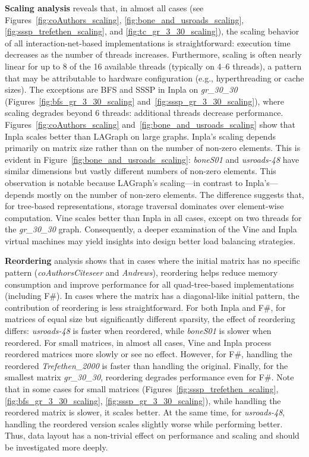 \textbf{Scaling analysis} reveals that, in almost all cases (see Figures~\ref{fig:coAuthors_scaling}, \ref{fig:bone_and_usroads_scaling}, \ref{fig:sssp_trefethen_scaling}, and \ref{fig:tc_gr_3_30_scaling}), the scaling behavior of all interaction-net-based implementations is straightforward: execution time decreases as the number of threads increases.
Furthermore, scaling is often nearly linear for up to 8 of the 16 available threads (typically on 4--6 threads), a pattern that may be attributable to hardware configuration (e.g., hyperthreading or cache sizes).
The exceptions are BFS and SSSP in Inpla on \emph{gr\_30\_30} (Figures~\ref{fig:bfs_gr_3_30_scaling} and~\ref{fig:sssp_gr_3_30_scaling}), where scaling degrades beyond 6 threads: additional threads decrease performance. 
Figures~\ref{fig:coAuthors_scaling} and~\ref{fig:bone_and_usroads_scaling} show that Inpla scales better than LAGraph on large graphs.
Inpla's scaling depends primarily on matrix size rather than on the number of non-zero elements.
This is evident in Figure~\ref{fig:bone_and_usroads_scaling}: \emph{boneS01} and \emph{usroads-48} have similar dimensions but vastly different numbers of non-zero elements.
This observation is notable because LAGraph's scaling---in contrast to Inpla's---depends mostly on the number of non-zero elements.
The difference suggests that, for tree-based representations, storage traversal dominates over element-wise computation.
Vine scales better than Inpla in all cases, except on two threads for the \emph{gr\_30\_30} graph.
Consequently, a deeper examination of the Vine and Inpla virtual machines may yield insights into design better load balancing strategies.

\textbf{Reordering} analysis shows that in cases where the initial matrix has no specific pattern (\emph{coAuthorsCiteseer} and \emph{Andrews}), reordering helps reduce memory consumption and improve performance for all quad-tree-based implementations (including F\#).
In cases where the matrix has a diagonal-like initial pattern, the contribution of reordering is less straightforward. 
For both Inpla and F\#, for matrices of equal size but significantly different sparsity, the effect of reordering differs: \emph{usroads-48} is faster when reordered, while \emph{boneS01} is slower when reordered.
For small matrices, in almost all cases, Vine and Inpla process reordered matrices more slowly or see no effect.
However, for F\#, handling the reordered \emph{Trefethen\_2000} is faster than handling the original.
Finally, for the smallest matrix \emph{gr\_30\_30}, reordering degrades performance even for F\#.
Note that in some cases for small matrices (Figures~\ref{fig:sssp_trefethen_scaling}, \ref{fig:bfs_gr_3_30_scaling}, \ref{fig:sssp_gr_3_30_scaling}), while handling the reordered matrix is slower, it scales better. 
At the same time, for \emph{usroads-48}, handling the reordered version scales slightly worse while performing better.
Thus, data layout has a non-trivial effect on performance and scaling and should be investigated more deeply.

